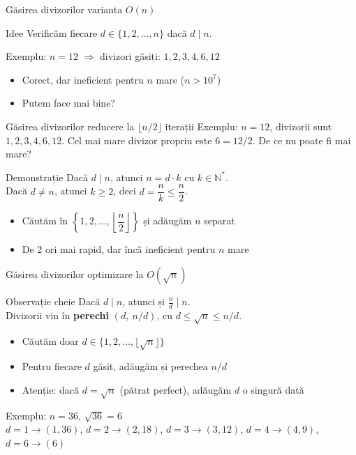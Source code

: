 \documentclass[10pt]{beamer}
\begin{document}
\begin{frame}{Găsirea divizorilor \textemdash{} varianta $O(n)$}
  \begin{block}{Idee}
    Verificăm fiecare $d \in \{1, 2, \ldots, n\}$ dacă $d \mid n$.
  \end{block}
  Exemplu: $n = 12$ $\Rightarrow$ divizori găsiți: $1, 2, 3, 4, 6, 12$
  \begin{itemize}
    \item Corect, dar ineficient pentru $n$ mare ($n > 10^7$)
    \item Putem face mai bine?
  \end{itemize}
\end{frame}

\begin{frame}{Găsirea divizorilor \textemdash{} reducere la $\lfloor n/2 \rfloor$ iterații}
  Exemplu: $n = 12$, divizorii sunt $1, 2, 3, 4, 6, 12$.
  Cel mai mare divizor propriu este $6 = 12/2$. De ce nu poate fi mai mare?
  \begin{block}{Demonstrație}
    Dacă $d \mid n$, atunci $n = d \cdot k$ cu $k \in \mathbb{N}^*$.\\
    Dacă $d \neq n$, atunci $k \geq 2$, deci $d = \dfrac{n}{k} \leq \dfrac{n}{2}$.
  \end{block}
  \begin{itemize}
    \item Căutăm în $\left\{1, 2, \ldots, \left\lfloor\dfrac{n}{2}\right\rfloor\right\}$ și adăugăm $n$ separat
    \item De 2 ori mai rapid, dar încă ineficient pentru $n$ mare
  \end{itemize}
\end{frame}

\begin{frame}{Găsirea divizorilor \textemdash{} optimizare la $O(\sqrt{n})$}
  \begin{block}{Observație cheie}
    Dacă $d \mid n$, atunci și $\frac{n}{d} \mid n$.\\
    Divizorii vin în \textbf{perechi} $(d,\ n/d)$, cu $d \leq \sqrt{n} \leq n/d$.
  \end{block}
  \begin{itemize}
    \item Căutăm doar $d \in \{1, 2, \ldots, \lfloor\sqrt{n}\rfloor\}$
    \item Pentru fiecare $d$ găsit, adăugăm și perechea $n/d$
    \item \alert{Atenție:} dacă $d = \sqrt{n}$ (pătrat perfect), adăugăm $d$ o singură dată
  \end{itemize}
  \smallskip
  Exemplu: $n = 36$, $\sqrt{36} = 6$\\
  $d=1\to(1,36)$, $d=2\to(2,18)$, $d=3\to(3,12)$, $d=4\to(4,9)$, $d=6\to(6)$
\end{frame}
\end{document}
